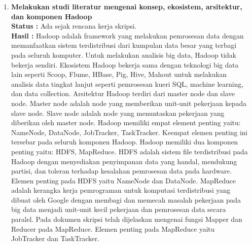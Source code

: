 \documentclass[a4paper,twoside]{article}
\begin{document}
\begin{enumerate}
		\item \textbf{Melakukan studi literatur mengenai konsep, ekosistem, arsitektur, dan komponen Hadoop}\\
		{\bf Status :} Ada sejak rencana kerja skripsi.\\
		{\bf Hasil :} Hadoop adalah framework yang melakukan pemrosesan data dengan memanfaatkan sistem terdistribusi dari kumpulan data besar yang terbagi pada seluruh komputer. Untuk melakukan analisis big data, Hadoop tidak bekerja sendiri. Ekosistem Hadoop bekerja sama dengan teknologi big data lain seperti Scoop, Flume, HBase, Pig, Hive, Mahout untuk melakukan analisis data tingkat lanjut seperti pemrosesan kueri SQL, machine learning, dan data collection. Arsitektur Hadoop terdiri dari master node dan slave node. Master node adalah node yang memberikan unit-unit pekerjaan kepada slave node. Slave node adalah node yang menuntaskan pekerjaan yang diberikan oleh master node. Hadoop memiliki empat element penting yaitu: NameNode, DataNode, JobTracker, TaskTracker. Keempat elemen penting ini tersebar pada seluruh komponen Hadoop. Hadoop memiliki dua komponen penting yaitu: HDFS, MapReduce. HDFS adalah sistem file terdistribusi pada Hadoop dengan menyediakan penyimpanan data yang handal, mendukung partisi, dan toleran terhadap kesalahan pemrosesan data pada hardware. Elemen penting pada HDFS yaitu NameNode dan DataNode. MapReduce adalah kerangka kerja pemrograman untuk komputasi terdistribusi yang dibuat oleh Google dengan membagi dan memecah masalah pekerjaan pada big data menjadi unit-unit kecil pekerjaan dan pemrosesan data secara paralel. Pada dokumen skripsi telah dijelaskan mengenai fungsi Mapper dan Reducer pada MapReduce. Elemen penting pada MapReduce yaitu JobTracker dan TaskTracker.
		

\end{enumerate}
\end{document}
